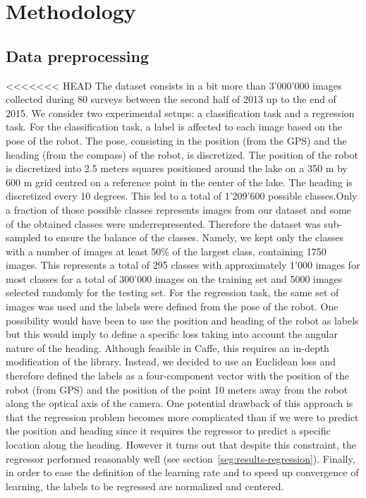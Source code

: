 \section{Methodology}

%

%

\subsection{Data preprocessing}


<<<<<<< HEAD
The dataset consists in a bit more than 3'000'000 images collected during 80 surveys between the second half of 2013 up to the end of 2015. We consider two experimental setups: a classification task and a regression task. For the classification task, a label is affected to each image based on the pose of the robot. The pose, consisting in the position (from the GPS) and the heading (from the compass) of the robot, is discretized. The position of the robot is discretized into 2.5 meters squares positioned around the lake on a 350 m by 600 m grid centred on a reference point in the center of the lake. The heading is discretized every 10 degrees. This led to a total of 1'209'600 possible classes.Only a fraction of those possible classes represents images from our dataset and some of the obtained classes were underrepresented. Therefore the dataset was sub-sampled to ensure the balance of the classes. Namely, we kept only the classes with a number of images at least 50\% of the largest class, containing 1750 images. This represents a total of 295 classes with approximately 1'000 images for most classes for a total of 300'000 images on the training set and 5000 images selected randomly for the testing set. For the regression task, the same set of images was used and the labels were defined from the pose of the robot. One possibility would have been to use the position and heading of the robot as labels but this would imply to define a specific loss taking into account the angular nature of the heading. Although feasible in Caffe, this requires an in-depth modification of the library. Instead, we decided to use an Euclidean loss and therefore defined the labels as a four-component vector with the position of the robot (from GPS) and the position of the point 10 meters away from the robot along the optical axis of the camera. One potential drawback of this approach is that the regression problem becomes more complicated than if we were to predict the position and heading since it requires the regressor to predict a specific location along the heading. However it turns out that despite this constraint, the regressor performed reasonably well (see section~\ref{seg:results-regression}). Finally, in order to ease the definition of the learning rate and to speed up convergence of learning, the labels to be regressed are normalized and centered.
